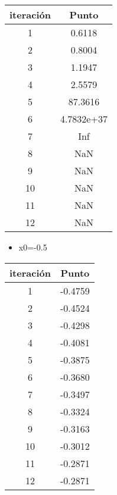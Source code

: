 \documentclass{udpreport}
\begin{document}
\begin{enumerate}
\begin{enumerate}
\begin{table}[H]
\begin{tabular} { |c|c|}
        \hline
        iteración  &  Punto\\
        \hline
        1 &  0.6118        \\
         \hline
        2 &   0.8004       \\
         \hline
        3 &   1.1947       \\
         \hline
        4 &   2.5579      \\
         \hline
        5 &  87.3616      \\
         \hline
        6 & 4.7832e+37     \\
         \hline
        7 &  Inf         \\
         \hline
        8 &  NaN       \\
         \hline
        9 & NaN      \\
         \hline
        10 &   NaN       \\
         \hline
        11 &  NaN        \\
         \hline
        12 &   NaN        \\
        \hline
        
        \end{tabular}
    \end{table}
 
 \begin{itemize}
 \newpage
\item x0=-0.5
\end{itemize}
\begin{table}[H]
    \centering
        \begin{tabular} { |c|c|}
        
        \hline
        iteración  &  Punto\\
        \hline
        1 & -0.4759        \\
         \hline
        2 &  -0.4524        \\
         \hline
        3 &  -0.4298       \\
         \hline
        4 &   -0.4081      \\
         \hline
        5 &  -0.3875       \\
         \hline
        6 &   -0.3680     \\
         \hline
        7 &  -0.3497      \\
         \hline
        8 &  -0.3324       \\
         \hline
        9 &  -0.3163       \\
         \hline
        10 &  -0.3012       \\
         \hline
        11 &  -0.2871     \\
         \hline
        12 &  -0.2871       \\
        \hline
        \end{tabular}
\end{table}


\end{enumerate}
\end{enumerate}
\end{document}
